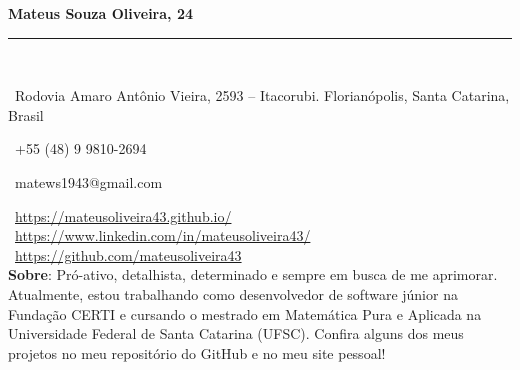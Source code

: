 \documentclass[a4paper,10pt]{article}
\makeatletter
\newcommand{\profissional}{Mateus Souza Oliveira}
\newcommand{\idade}{24}
\newcommand{\Endereco}{Rodovia Amaro Antônio Vieira, 2593 -- Itacorubi. Florianópolis, Santa Catarina, Brasil}
\newcommand{\telefone}{+55 (48) 9 9810-2694}
\newcommand{\email}{matews1943@gmail.com}
\newcommand{\sobre}{
    Pró-ativo, detalhista, determinado e sempre em busca de me aprimorar. Atualmente, estou trabalhando como desenvolvedor de software júnior na Fundação CERTI e cursando o mestrado em Matemática Pura e Aplicada na Universidade Federal de Santa Catarina (UFSC). Confira alguns dos meus projetos no meu repositório do GitHub e no meu site pessoal!
    \vspace{2\baselineskip}
}
\makeatother
\begin{document}
	
	\noindent
	\hfill
	\begin{minipage}{0.65\linewidth}
		\Huge{\bf \profissional, \idade}\\\vspace{-1.75\baselineskip}
		
		\noindent\rule{\textwidth}{1.5pt} {\ }\\\vspace{-1.8\baselineskip}
		
		\large{
		\faMapMarker \ \Endereco \\
		\begin{minipage}{0.5\linewidth}
			\faWhatsapp \ \telefone
		\end{minipage}
		\begin{minipage}{0.5\linewidth}
			\faEnvelope \ \email
		\end{minipage}
		\faLink \ \url{https://mateusoliveira43.github.io/}\\
		\faLinkedinSquare \ \url{https://www.linkedin.com/in/mateusoliveira43/}\\
		\faGithub \ \url{https://github.com/mateusoliveira43} \\
		\vfill
		\textbf{Sobre}: \sobre
		}
	\end{minipage}
\end{document}
